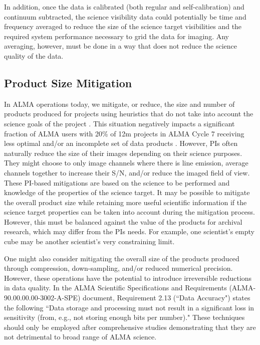 \documentclass[preprint]{aastex631}
\begin{document}
 In addition, once the data is calibrated (both regular and self-calibration) and continuum subtracted, the science visibility data could potentially be time and frequency averaged to reduce the size of the science target visibilities and the required system performance necessary to grid the data for imaging. Any averaging, however, must be done in a way that does not reduce the science quality of the data.

\subsection{Product Size Mitigation} \label{sec:discussion_mitigation}

In ALMA operations today, we mitigate, or reduce, the size and number of products produced for projects using heuristics  that do not take into account the science goals of the project \citep{Hunter2023TheHeuristics}. This situation negatively impacts a significant fraction of ALMA users with 20\% of 12m projects in ALMA Cycle 7 receiving less optimal and/or an incomplete set of data products \citep{Kepley2023Mitigation}. However, PIs often naturally reduce the size of their images depending on their science purposes. They might choose to only image channels where there is line emission, average channels together to increase their S/N, and/or reduce the imaged field of view. These PI-based mitigations are based on the science to be performed and knowledge of the properties of the science target. It may be possible to mitigate the overall product size while retaining more useful scientific information if the science target properties can be taken into account during the mitigation process. However, this must be balanced against the value of the products for archival research, which may differ from the PIs needs. For example, one scientist's empty cube may be another scientist's very constraining limit. 

One might also consider mitigating the overall size of the products produced through compression, down-sampling, and/or reduced numerical precision. However, these operations have the potential to introduce irreversible reductions in data quality. In the ALMA Scientific Specifications and Requirements (ALMA-90.00.00.00-3002-A-SPE) document, Requirement 2.13 (``Data Accuracy") states the following ``Data storage and processing must not result in a significant loss in sensitivity (from, e.g., not storing enough bits per number)." These techniques should only be employed after comprehensive studies demonstrating  that they are not detrimental to broad range of ALMA science.
\end{document}
